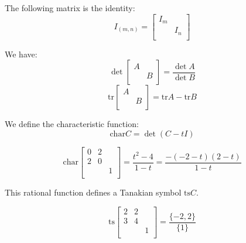\begin{definition}
  The following matrix is the identity:
  $$I_{(m, n)} = \begin{bmatrix}
    I_m & \\ & I_n \\
  \end{bmatrix}$$
\end{definition}

\begin{definition}
  We have: 
  $$\det \begin{bmatrix}
    A & \\ & B \\
  \end{bmatrix} = \frac{\det A}{\det B}$$
  $$\text{tr} \begin{bmatrix}
    A & \\ & B \\
  \end{bmatrix} = \text{tr} A - \text{tr} B$$
\end{definition}

\begin{definition}
  We define the characteristic function:
  $$\text{char} C = \det(C - tI)$$
\end{definition}

\begin{example}
  $$\text{char} \begin{bmatrix}
  0 & 2 & \\ 
  2 & 0 & \\
    & & 1 \\
  \end{bmatrix} = \frac{t^2 - 4}{1 - t} = \frac{-(-2 - t)(2 - t)}{1 - t}$$
\end{example}

\begin{definition}
  This rational function defines a Tanakian symbol $\text{ts} C$.
\end{definition}

\begin{example}
  $$\text{ts} \begin{bmatrix}
    2 & 2 & \\ 
    3 & 4 & \\
    & & 1 \\
  \end{bmatrix} = \frac{\{-2, 2\}}{\{1\}}$$
\end{example}

